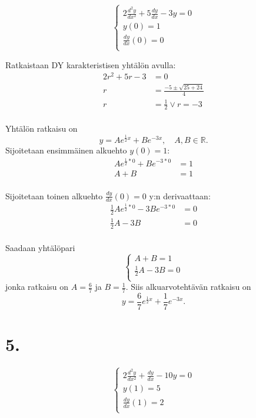 \documentclass{article}
\begin{document}
\[
  \begin{cases}
    2\frac{d^2 y}{d x^2} + 5\frac{dy}{dx} - 3y = 0 \\
    y(0) = 1 \\
    \frac{dy}{dx}(0) = 0 \\
  \end{cases}
\]

Ratkaistaan DY karakteristisen yhtälön avulla:
\begin{align*}
  2r^2 + 5r - 3 &= 0 \\
  r &= \frac{-5 \pm \sqrt{25 + 24}}{4} \\
  r &= \frac{1}{2} \vee r = -3 \\
\end{align*}

Yhtälön ratkaisu on
\[
  y = Ae^{\frac{1}{2}x} + Be^{-3x}, \quad A,B \in \mathbb{R}.
\]
Sijoitetaan ensimmäinen alkuehto $y(0) = 1$:
\begin{align*}
  Ae^{\frac{1}{2}*0} + Be^{-3*0} &= 1 \\
  A + B &= 1 \\
\end{align*}

Sijoitetaan toinen alkuehto $\frac{dy}{dx}(0) = 0$ y:n derivaattaan:
\begin{align*}
  \frac{1}{2}Ae^{\frac{1}{2}*0} - 3Be^{-3*0} &= 0 \\
  \frac{1}{2}A - 3B &= 0 \\
\end{align*}

Saadaan yhtälöpari
\[
  \begin{cases}
    A + B = 1 \\
    \frac{1}{2}A - 3B = 0 \\
  \end{cases}
\]
jonka ratkaisu on $A = \frac{6}{7}$ ja $B = \frac{1}{7}$.
Siis alkuarvotehtävän ratkaisu on
\[
  y = \frac{6}{7}e^{\frac{1}{2}x} + \frac{1}{7}e^{-3x}.
\]

\section*{5.}

\[
  \begin{cases}
    2\frac{d^2 y}{d x^2} + \frac{dy}{dx} - 10y = 0 \\
    y(1) = 5 \\
    \frac{dy}{dx}(1) = 2 \\
  \end{cases}
\]
\end{document}
